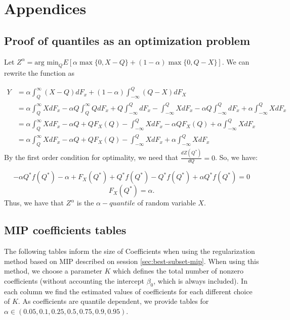 \section{Appendices}
\label{appendice}

\subsection{Proof of quantiles as an optimization problem}
\label{sec:quantile-proof}
Let $Z^{\alpha}=\mbox{arg min}_{Q}E[\alpha\max\{0,X-Q\}+(1-\alpha)\max\{0,Q-X\}].$
We can rewrite the function as

\[
\begin{aligned}Y & =\alpha\int_{Q}^{\infty}(X-Q)dF_{x}+(1-\alpha)\int_{-\infty}^{Q}(Q-X)dF_{X}\\
& =\alpha\int_{Q}^{\infty}XdF_{x}-\alpha Q\int_{Q}^{\infty}QdF_{x}+Q\int_{-\infty}^{Q}dF_{x}-\int_{-\infty}^{Q}XdF_{x}-\alpha Q\int_{-\infty}^{Q}dF_{x}+\alpha\int_{-\infty}^{Q}XdF_{x}\\
& =\alpha\int_{Q}^{\infty}XdF_{x}-\alpha Q+QF_{X}(Q)-\int_{-\infty}^{Q}XdF_{x}-\alpha QF_{X}(Q)+\alpha\int_{-\infty}^{Q}XdF_{x}\\
& =\alpha\int_{Q}^{\infty}XdF_{x}-\alpha Q+QF_{X}(Q)-\int_{-\infty}^{Q}XdF_{x}+\alpha\int_{-\infty}^{Q}XdF_{x}
\end{aligned}
\]
By the first order condition for optimality, we need that $\frac{dZ(Q^{*})}{dQ}=0$.
So, we have:

\[
-\alpha Q^{*}f(Q^{*})-\alpha+F_{X}(Q^{*})+Q^{*}f(Q^{*})-Q^{*}f(Q^{*})+\alpha Q^{*}f(Q^{*})=0
\]
\[
F_{X}(Q^{*})=\alpha.
\]
Thus, we have that $Z^\alpha$ is the $\alpha-quantile$ of random variable $X$.

\subsection{MIP coefficients tables}

The following tables inform the size of Coefficients when using the regularization method based on MIP described on session \ref{sec:best-subset-mip}. When using this method, we choose a parameter $K$ which defines the total number of nonzero coefficients (without accounting the intercept $\beta_0$, which is always included). 
In each column we find the estimated values of coefficients for each different choice of $K$. As coefficients are quantile dependent, we provide tables for $\alpha \in (0.05, 0.1, 0.25, 0.5, 0.75, 0.9, 0.95)$.


